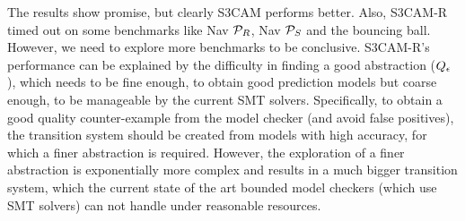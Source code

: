
The results show promise, but clearly S3CAM performs better. Also,
S3CAM-R timed out on some benchmarks like Nav $\mathcal{P}_R$, Nav $\mathcal{P}_S$
and the bouncing ball. However, we need to explore more benchmarks to
be conclusive. S3CAM-R's performance can be explained by the
difficulty in finding a good abstraction ($Q_\epsilon$), which
needs to be fine enough, to obtain good prediction models but coarse
enough, to be manageable by the current SMT solvers. Specifically, to
obtain a good quality counter-example from the model checker (and
avoid false positives), the transition system should be created from
models with high accuracy, for which a finer abstraction is required.
However, the exploration of a finer abstraction is exponentially more
complex and results in a much bigger transition system, which the
current state of the art bounded model checkers (which use SMT
solvers) can not handle under reasonable resources.
